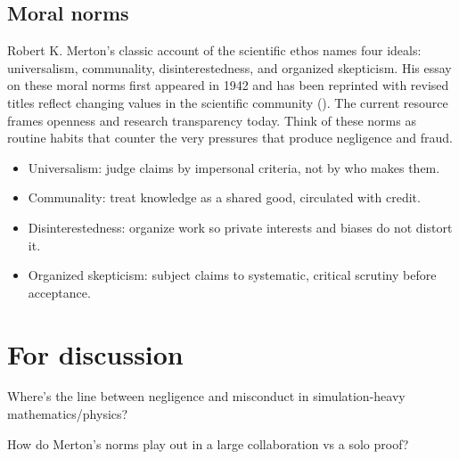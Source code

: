 \documentclass[
  a4paper,
  DIV=11,
  numbers=noendperiod,
  oneside]{scrreprt}
\providecommand{\tightlist}{%
  \setlength{\itemsep}{0pt}\setlength{\parskip}{0pt}}
\begin{document}
\subsection{Moral norms}\label{moral-norms}

Robert K. Merton's classic account of the scientific ethos names four
ideals: universalism, communality, disinterestedness, and organized
skepticism. His essay on these moral norms first appeared in 1942 and
has been reprinted with revised titles reflect changing values in the
scientific community (). The
current resource frames openness and research transparency today. Think
of these norms as routine habits that counter the very pressures that
produce negligence and fraud.

\begin{itemize}
\tightlist
\item
  Universalism: judge claims by impersonal criteria, not by who makes
  them.
\item
  Communality: treat knowledge as a shared good, circulated with credit.
\item
  Disinterestedness: organize work so private interests and biases do
  not distort it.
\item
  Organized skepticism: subject claims to systematic, critical scrutiny
  before acceptance.
\end{itemize}

\section{For discussion}\label{for-discussion}

\begin{tcolorbox}[enhanced jigsaw, opacitybacktitle=0.6, colframe=quarto-callout-important-color-frame, bottomrule=.15mm, coltitle=black, colback=white, title={Draw a line}, breakable, toptitle=1mm, arc=.35mm, left=2mm, opacityback=0, rightrule=.15mm, bottomtitle=1mm, colbacktitle=quarto-callout-important-color!10!white, toprule=.15mm, leftrule=.75mm, titlerule=0mm]

Where's the line between negligence and misconduct in simulation-heavy
mathematics/physics?

\end{tcolorbox}

\begin{tcolorbox}[enhanced jigsaw, opacitybacktitle=0.6, colframe=quarto-callout-important-color-frame, bottomrule=.15mm, coltitle=black, colback=white, title={Together or alone?}, breakable, toptitle=1mm, arc=.35mm, left=2mm, opacityback=0, rightrule=.15mm, bottomtitle=1mm, colbacktitle=quarto-callout-important-color!10!white, toprule=.15mm, leftrule=.75mm, titlerule=0mm]

How do Merton's norms play out in a large collaboration vs a solo proof?

\end{tcolorbox}
\end{document}
